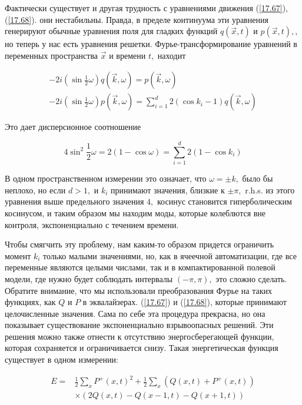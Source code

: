 \documentclass[main.tex]{subfiles}
\begin{document}
Фактически существует и другая трудность с уравнениями движения (\ref{17.67}), (\ref{17.68}).
они нестабильны. Правда, в пределе континуума эти уравнения генерируют обычные уравнения поля для гладких функций $q(\vec{x}, t)$ и $p(\vec{x}, t),$, но теперь у нас есть уравнения решетки. Фурье-трансформирование уравнений в переменных пространства $\vec{x}$ и времени $t,$ находит

\begin{equation}\label{17.73}
\begin{array}{l}
{-2 i\left(\sin \frac{1}{2} \omega\right) q(\vec{k}, \omega)=p(\vec{k}, \omega)} \\
{-2 i\left(\sin \frac{1}{2} \omega\right) p(\vec{k}, \omega)=\sum_{i=1}^{d} 2\left(\cos k_{i}-1\right) q(\vec{k}, \omega)}
\end{array}
\end{equation}

Это дает дисперсионное соотношение

\begin{equation}\label{17.74}
4 \sin ^{2} \frac{1}{2} \omega=2(1-\cos \omega)=\sum_{i=1}^{d} 2\left(1-\cos k_{i}\right)
\end{equation}

В одном пространственном измерении это означает, что $\omega=\pm k,$ было бы неплохо, но если $d>1,$ и $k_{i}$ принимают значения, близкие к $\pm \pi,$ r.h.s. из этого уравнения выше предельного значения $4,$ косинус становится гиперболическим косинусом, и таким образом мы находим моды, которые колеблются вне контроля, экспоненциально с течением времени.

Чтобы смягчить эту проблему, нам каким-то образом придется ограничить момент $k_{i}$ только малыми значениями, но, как в ячеечной автоматизации, где все переменные являются целыми числами, так и в компактированной полевой модели, где нужно будет соблюдать интервалы $(-\pi, \pi),$ это сложно сделать. Обратите внимание, что мы использовали преобразования Фурье на таких функциях, как $Q$ и $P$ в эквалайзерах. (\ref{17.67}) и (\ref{17.68}), которые принимают целочисленные значения. Сама по себе эта процедура прекрасна, но она показывает существование экспоненциально взрывоопасных решений. Эти решения можно также отнести к отсутствию энергосберегающей функции, которая сохраняется и ограничивается снизу. Такая энергетическая функция существует в одном измерении:

\begin{equation}\label{17.74}
\begin{aligned}
E=& \frac{1}{2} \sum_{x} P^{+}(x, t)^{2}+\frac{1}{2} \sum_{x}\left(Q(x, t)+P^{+}(x, t)\right) \\
& \times(2 Q(x, t)-Q(x-1, t)-Q(x+1, t))
\end{aligned}
\end{equation}
\end{document}
